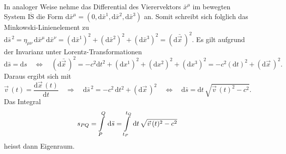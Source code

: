 \documentclass[a4paper,12pt]{article}
\numberwithin{equation}{section}
\begin{document}
In analoger Weise nehme das Differential des Vierervektors $\bar{x}^\mu$ im bewegten System $\overline{\textrm{IS}}$ die Form $\mathrm{d}\bar{x}^\mu = (0,\mathrm{d}\bar{x}^1,\mathrm{d}\bar{x}^2,\mathrm{d}\bar{x}^3)$ an. Somit schreibt sich folglich das Minkowski-Linienelement zu $\mathrm{d}\bar{s}^{\,2} = \eta_{\mu\nu}\,\mathrm{d}\bar{x}^\mu\,\mathrm{d}\bar{x}^\nu = (\mathrm{d}\bar{x}^1)^2+(\mathrm{d}\bar{x}^2)^2+(\mathrm{d}\bar{x}^3)^2 = (\mathrm{d}\bar{\vec{x}}\,)^2$. Es gilt aufgrund der Invarianz unter Lorentz-Transformationen \begin{equation}
\mathrm{d}\bar{s} = \mathrm{d}s \quad \Leftrightarrow \quad (\mathrm{d}\bar{\vec{x}}\,)^2 = -c^2\mathrm{d}t^2 + (\mathrm{d}x^1)^2 + (\mathrm{d}x^2)^2 + (\mathrm{d}x^3)^2 = -c^2(\mathrm{d}t)^2 + (\mathrm{d}\vec{x}\,)^2.
\end{equation} Daraus ergibt sich mit \begin{equation}
\vec{v}\,(t) = \frac{\mathrm{d}\vec{x}\,(t)}{\mathrm{d}t} \quad \Rightarrow \quad \mathrm{d}\bar{s}^{\,2} = -c^2\,\mathrm{d}t^2+(\mathrm{d}\vec{x}\,)^2 \quad \Leftrightarrow \quad \mathrm{d}\bar{s} = \mathrm{d}t\,\sqrt{\vec{v}\,(t)^2-c^2}.
\end{equation} Das Integral \begin{equation}
s_{PQ} = \int\displaylimits_{P}^{Q} \, \mathrm{d}\bar{s} = \int\displaylimits_{t_P}^{t_Q}\,\mathrm{d}t\,\sqrt{\vec{v}\,(t)^2-c^2}
\end{equation} heisst dann Eigenraum.
\end{document}

